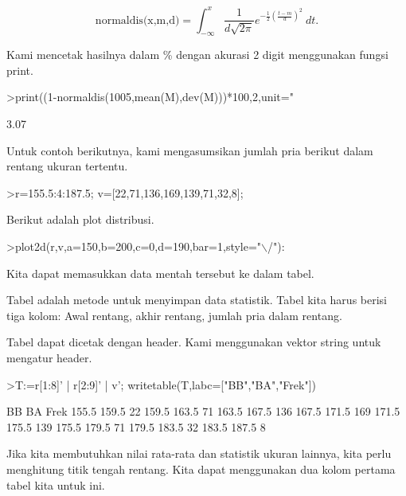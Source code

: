 \documentclass[a4paper,10pt]{article}
\begin{document}
\begin{eulernotebook}
\begin{eulercomment}
\end{eulercomment}
\begin{eulerformula}
\[
\text{normaldis(x,m,d)}=\int_{-\infty}^x \frac{1}{d\sqrt{2\pi}}e^{-\frac{1}{2}(\frac{t-m}{d})^2}\ dt.
\]
\end{eulerformula}
\begin{eulercomment}
Kami mencetak hasilnya dalam \% dengan akurasi 2 digit menggunakan
fungsi print.
\end{eulercomment}
\begin{eulerprompt}
>print((1-normaldis(1005,mean(M),dev(M)))*100,2,unit=" %
\end{eulerprompt}
\begin{euleroutput}
        3.07 %
\end{euleroutput}
\begin{eulercomment}
Untuk contoh berikutnya, kami mengasumsikan jumlah pria berikut dalam
rentang ukuran tertentu.
\end{eulercomment}
\begin{eulerprompt}
>r=155.5:4:187.5; v=[22,71,136,169,139,71,32,8];
\end{eulerprompt}
\begin{eulercomment}
Berikut adalah plot distribusi.
\end{eulercomment}
\begin{eulerprompt}
>plot2d(r,v,a=150,b=200,c=0,d=190,bar=1,style="\(\backslash\)/"):
\end{eulerprompt}
\begin{eulercomment}
Kita dapat memasukkan data mentah tersebut ke dalam tabel.

Tabel adalah metode untuk menyimpan data statistik. Tabel kita harus
berisi tiga kolom: Awal rentang, akhir rentang, jumlah pria dalam
rentang.

Tabel dapat dicetak dengan header. Kami menggunakan vektor string
untuk mengatur header.
\end{eulercomment}
\begin{eulerprompt}
>T:=r[1:8]' | r[2:9]' | v'; writetable(T,labc=["BB","BA","Frek"])
\end{eulerprompt}
\begin{euleroutput}
          BB        BA      Frek
       155.5     159.5        22
       159.5     163.5        71
       163.5     167.5       136
       167.5     171.5       169
       171.5     175.5       139
       175.5     179.5        71
       179.5     183.5        32
       183.5     187.5         8
\end{euleroutput}
\begin{eulercomment}
Jika kita membutuhkan nilai rata-rata dan statistik ukuran lainnya,
kita perlu menghitung titik tengah rentang. Kita dapat menggunakan dua
kolom pertama tabel kita untuk ini.


\end{eulercomment}
\end{eulernotebook}
\end{document}
